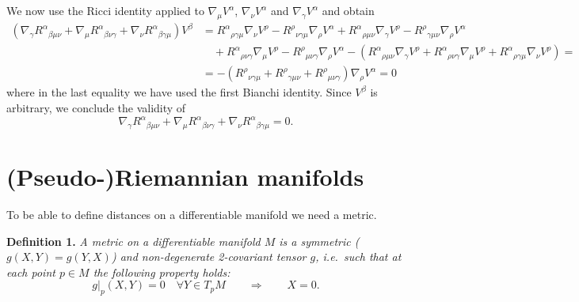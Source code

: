 \begin{points}
\item We now use the Ricci identity applied to $\nabla_\mu V^\alpha$, $\nabla_\nu V^\alpha$ and $\nabla_\gamma V^\alpha$ and obtain
\begin{align*}
  \left(\nabla_\gamma R^\alpha{}_{\beta\mu\nu}+\nabla_\mu R^\alpha{}_{\beta\nu\gamma}+\nabla_\nu R^\alpha{}_{\beta\gamma\mu}\right)V^\beta&=R^\alpha{}_{\rho\gamma\mu}\nabla_\nu V^\rho-R^\rho{}_{\nu\gamma\mu}\nabla_\rho V^\alpha+R^\alpha{}_{\rho\mu\nu}\nabla_\gamma V^\rho-R^\rho{}_{\gamma\mu\nu}\nabla_\rho V^\alpha\\
  &\quad+R^\alpha{}_{\rho\nu\gamma}\nabla_\mu V^\rho-R^\rho{}_{\mu\nu\gamma}\nabla_\rho V^\alpha-\left(R^\alpha{}_{\rho\mu\nu}\nabla_\gamma V^\rho+R^\alpha{}_{\rho\nu\gamma}\nabla_\mu V^\rho+R^\alpha{}_{\rho\gamma\mu}\nabla_\nu V^\rho\right)=\\
  &=-\left(R^\rho{}_{\nu\gamma\mu}+R^\rho{}_{\gamma\mu\nu}+R^\rho{}_{\mu\nu\gamma}\right)\nabla_\rho V^\alpha=0
\end{align*}
where in the last equality we have used the first Bianchi identity. Since $V^\beta$ is arbitrary, we conclude the validity of
\[
  \nabla_\gamma R^\alpha{}_{\beta\mu\nu}+\nabla_\mu R^\alpha{}_{\beta\nu\gamma}+\nabla_\nu R^\alpha{}_{\beta\gamma\mu}=0 .
\]
\end{points}

\section{(Pseudo-)Riemannian manifolds}

\begin{points}
\item To be able to define distances on a differentiable manifold we need a metric.
\end{points}

\textbf{Definition 1.} \emph{A metric on a differentiable manifold $M$ is a symmetric ($g(X,Y)=g(Y,X)$) and non-degenerate 2-covariant tensor $g$, i.e.\ such that at each point $p\in M$ the following property holds:}
\[
  g|_p(X,Y)=0\quad\forall Y\in T_pM\qquad\Longrightarrow\qquad X=0 .
\]

